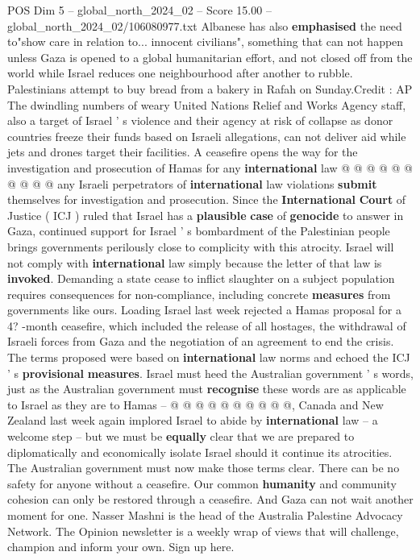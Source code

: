 \begin{textsample}{POS Dim 5 – global\_north\_2024\_02 – Score 15.00 – global\_north\_2024\_02/106080977.txt}
Albanese has also \textbf{emphasised} the need to"show care in relation to... innocent civilians", something that can not happen unless Gaza is opened to a global humanitarian effort, and not closed off from the world while Israel reduces one neighbourhood after another to rubble.
Palestinians attempt to buy bread from a bakery in Rafah on Sunday.Credit : AP The dwindling numbers of weary United Nations Relief and Works Agency staff, also a target of Israel ' s violence and their agency at risk of collapse as donor countries freeze their funds based on Israeli allegations, can not deliver aid while jets and drones target their facilities.
A ceasefire opens the way for the investigation and prosecution of Hamas for any \textbf{international} law @ @ @ @ @ @ @ @ @ @ any Israeli perpetrators of \textbf{international} law violations \textbf{submit} themselves for investigation and prosecution.
Since the \textbf{International} \textbf{Court} of Justice ( ICJ ) ruled that Israel has a \textbf{plausible} \textbf{case} of \textbf{genocide} to answer in Gaza, continued support for Israel ' s bombardment of the Palestinian people brings governments perilously close to complicity with this atrocity.
Israel will not comply with \textbf{international} law simply because the letter of that law is \textbf{invoked}.
Demanding a state cease to inflict slaughter on a subject population requires consequences for non-compliance, including concrete \textbf{measures} from governments like ours.
Loading Israel last week rejected a Hamas proposal for a 4? -month ceasefire, which included the release of all hostages, the withdrawal of Israeli forces from Gaza and the negotiation of an agreement to end the crisis.
The terms proposed were based on \textbf{international} law norms and echoed the ICJ ' s \textbf{provisional} \textbf{measures}.
Israel must heed the Australian government ' s words, just as the Australian government must \textbf{recognise} these words are as applicable to Israel as they are to Hamas -- @ @ @ @ @ @ @ @ @ @, Canada and New Zealand last week again implored Israel to abide by \textbf{international} law -- a welcome step -- but we must be \textbf{equally} clear that we are prepared to diplomatically and economically isolate Israel should it continue its atrocities.
The Australian government must now make those terms clear.
There can be no safety for anyone without a ceasefire.
Our common \textbf{humanity} and community cohesion can only be restored through a ceasefire.
And Gaza can not wait another moment for one.
Nasser Mashni is the head of the Australia Palestine Advocacy Network.
The Opinion newsletter is a weekly wrap of views that will challenge, champion and inform your own.
Sign up here.

\end{textsample}
